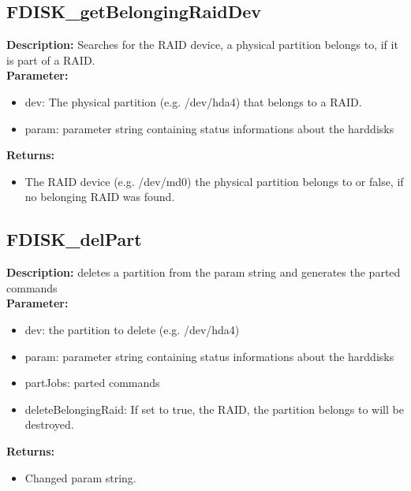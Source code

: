 \subsection{FDISK\_getBelongingRaidDev}
\textbf{Description:} Searches for the RAID device, a physical partition belongs to, if it is part of a RAID.\\
\textbf{Parameter:}
\begin{itemize}
\item dev: The physical partition (e.g. /dev/hda4) that belongs to a RAID.
\item param: parameter string containing status informations about the harddisks
\end{itemize}
\textbf{Returns:}
\begin{itemize}
\item The RAID device (e.g. /dev/md0) the physical partition belongs to or false, if no belonging RAID was found.
\end{itemize}

\subsection{FDISK\_delPart}
\textbf{Description:} deletes a partition from the param string and generates the parted commands\\
\textbf{Parameter:}
\begin{itemize}
\item dev: the partition to delete (e.g. /dev/hda4)
\item param: parameter string containing status informations about the harddisks
\item partJobs: parted commands
\item deleteBelongingRaid: If set to true, the RAID, the partition belongs to will be destroyed.
\end{itemize}
\textbf{Returns:}
\begin{itemize}
\item Changed param string.
\end{itemize}

